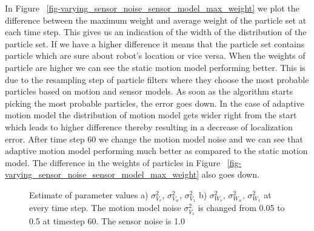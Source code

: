 \documentclass[12pt]{dalcsthesis}
\begin{document}
In Figure ~\ref{fig-varying_sensor_noise_sensor_model_max_weight} we plot the difference between the maximum weight and average weight of the particle set at each time step. This gives us an indication of the width of the distribution of the particle set. If we have a higher difference it means that the particle set contains particle which are sure about robot's location or vice versa. When the weights of particle are higher we can see the static motion model performing better. This is due to the resampling step of particle filters where they choose the most probable particles based on motion and sensor models. As soon as the algorithm starts picking the most probable particles, the error goes down. In the case of adaptive motion model the distribution of motion model gets wider right from the start which leads to higher difference thereby resulting in a decrease of localization error. After time step 60 we change the motion model noise and we can see that adaptive motion model performing much better as 
compared to the static motion model. The difference in the weights of particles in Figure ~\ref{fig-varying_sensor_noise_sensor_model_max_weight} also goes down.

\begin{figure}[!ht]
  \centering
     \qquad
  \caption{\label{fig-varying_sensor_noise_motion_model} Estimate of parameter values a) $\sigma_{V_{v}}^{2}$, $\sigma_{V_{w}}^{2}$,  $\sigma_{V_{1}}^{2}$ b)  $\sigma_{W_{v}}^{2}$, $\sigma_{W_{w}}^{2}$, $\sigma_{W_{1}}^{2}$ at every time step. The motion model noise $\sigma_{V_{v}}^{2}$ is changed from 0.05 to 0.5 at timestep 60. The sensor noise is 1.0}
\end{figure}
\end{document}
